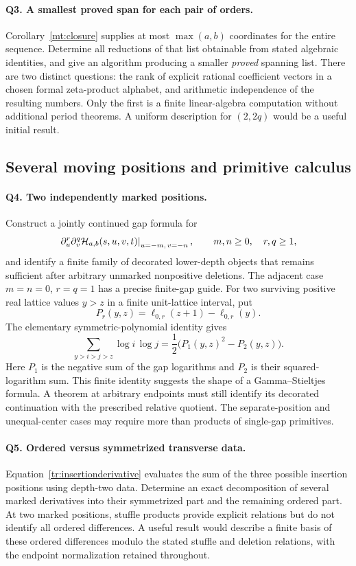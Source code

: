 \paragraph{Q3. A smallest proved span for each pair of orders.}
Corollary~\ref{mt:closure} supplies at most $\max(a,b)$ coordinates for
the entire sequence. Determine all reductions of that list obtainable
from stated algebraic identities, and give an algorithm producing a
smaller \emph{proved} spanning list. There are two distinct questions:
the rank of explicit rational coefficient vectors in a chosen formal
zeta-product alphabet, and arithmetic independence of the resulting
numbers. Only the first is a finite linear-algebra computation without
additional period theorems. A uniform description for $(2,2q)$ would
be a useful initial result.

\subsection{Several moving positions and primitive calculus}

\paragraph{Q4. Two independently marked positions.}
Construct a jointly continued gap formula for
\[
 \left.\partial_u^r\partial_v^q
       \mathcal H_{a,b}(s,u,v,t)\right|_{u=-m,\,v=-n},
 \qquad m,n\geq0,\quad r,q\geq1,
\]
and identify a finite family of decorated lower-depth objects that
remains sufficient after arbitrary unmarked nonpositive deletions.
The adjacent case $m=n=0$, $r=q=1$ has a precise finite-gap guide.
For two surviving positive real lattice values $y>z$ in a finite
unit-lattice interval, put
\[
 P_r(y,z)=\ell_{0,r}(z+1)-\ell_{0,r}(y).
\]
The elementary symmetric-polynomial identity gives
\[
 \sum_{y>i>j>z}\log i\,\log j
                 =\frac12\bigl(P_1(y,z)^2-P_2(y,z)\bigr).
\]
Here $P_1$ is the negative sum of the gap logarithms and $P_2$ is
their squared-logarithm sum. This finite identity suggests the shape
of a Gamma--Stieltjes formula. A theorem at arbitrary endpoints must
still identify its decorated continuation with the prescribed
relative quotient. The separate-position and unequal-center cases
may require more than products of single-gap primitives.

\paragraph{Q5. Ordered versus symmetrized transverse data.}
Equation~\eqref{tr:insertionderivative} evaluates the sum of the three
possible insertion positions using depth-two data. Determine an exact
decomposition of several marked derivatives into their symmetrized
part and the remaining ordered part. At two marked positions,
stuffle products provide explicit relations but do not identify all
ordered differences. A useful result would describe a finite basis
of these ordered differences modulo the stated stuffle and deletion
relations, with the endpoint normalization retained throughout.

